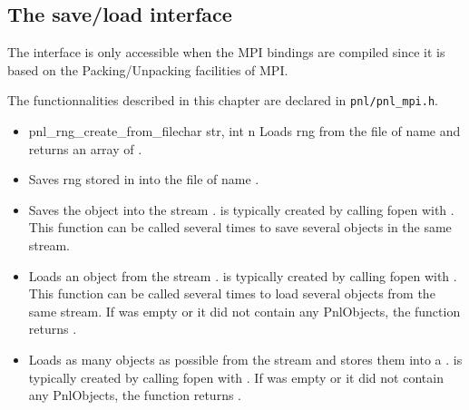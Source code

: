 \subsection{The save/load interface}

The interface is only accessible when the MPI bindings are compiled since it
is based on the Packing/Unpacking facilities of MPI.

The functionnalities described in this chapter are declared in \verb!pnl/pnl_mpi.h!.
\begin{itemize}
\item {}
  {pnl_rng_create_from_file}{char \ptr str, int n}
  \sshortdescribe Loads  rng from the file of name  and
  returns an array of  .
\item {}
    \sshortdescribe Saves  rng stored in  into the file of
  name .
\item {}
  \sshortdescribe Saves the object  into the stream . 
  is typically created by calling fopen with . This function can be
  called several times to save several objects in the same stream.
\item {}
  \sshortdescribe Loads an object from the stream . 
  is typically created by calling fopen with .  This function can be
  called several times to load several objects from the same stream. If 
  was empty or it did not contain any PnlObjects, the function returns .
\item {}
  \sshortdescribe Loads as many objects as possible from the stream  and
  stores them into a .  is typically created by
  calling fopen with . If  was empty or it did not contain
  any PnlObjects, the function returns .
\end{itemize}


